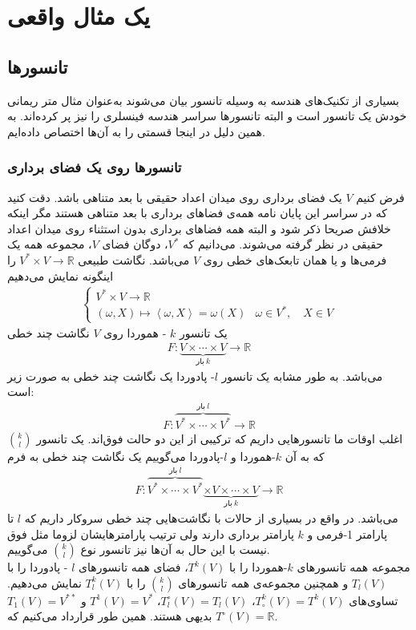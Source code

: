 \chapter{یک مثال واقعی }

\section{تانسورها}
بسیاری از تکنیک‌های هندسه به وسیله تانسور بیان می‌شوند به‌عنوان مثال متر ریمانی خودش یک تانسور است و البته تانسورها سراسر هندسه فینسلری را نیز پر کرده‌اند. به همین دلیل در اینجا قسمتی را به آن‌ها  اختصاص داده‌ایم.
\subsection{تانسورها روی یک فضای برداری}
فرض کنیم $V$ یک فضای برداری روی میدان اعداد حقیقی با بعد متناهی باشد. دقت کنید که در سراسر این پایان نامه همه‌ی فضاهای برداری با بعد متناهی هستند مگر اینکه خلافش صریحا ذکر شود و البته همه فضاهای برداری بدون استثناء روی میدان اعداد حقیقی در نظر گرفته می‌شوند. می‌دانیم که  $ V^* $، دوگان فضای $ V $، مجموعه همه یک فرمی‌ها و یا همان تابعک‌های خطی روی $V$  می‌باشد. نگاشت طبیعی 
$ V^* \times V \longrightarrow \mathbb{R} $ را اینگونه نمایش می‌دهیم
\begin{align*}
\left\lbrace
\begin{array}{lr}
V^* \times V \longrightarrow \mathbb{R} & \quad\\
\left( \omega,X\right)  \longmapsto \left \langle \omega,X \right \rangle = \omega(X) & \omega \in V^*,  \quad X \in V
\end{array}
 \right. 
\end{align*}
یک تانسور $ k $ - هموردا روی $ V $ نگاشت چند خطی 
\begin{align*}
F: \underbrace{V\times\cdots\times V}_{\text{بار}\ k} \longrightarrow \mathbb{R}
\end{align*}
 می‌باشد. به طور مشابه یک تانسور $ l $- پادوردا یک نگاشت چند خطی به صورت زیر است: 
\begin{align*}
F:\overbrace{V^*\times\cdots\times V^*}^{\text{بار}\ l}\longrightarrow \mathbb{R}
\end{align*}
اغلب اوقات ما تانسورهایی داریم که ترکیبی از این دو حالت فوق‌اند. یک تانسور $\binom{k}{l} $ که به آن $k$-هموردا و $l$-پادوردا می‌گوییم یک نگاشت چند خطی به فرم 
\begin{align*}
F:\overbrace{V^*\times\cdots\times V^*}^{\text{بار}\ l}%
\underbrace{\times V\times\cdots\times V}_{\text{بار}\ k}\longrightarrow \mathbb{R}
\end{align*}
می‌باشد. در واقع در بسیاری از حالات با نگاشت‌هایی چند خطی سروکار داریم که $l$ تا پارامتر 1-فرمی و $k$ پارامتر برداری دارند ولی ترتیب پارامترهایشان لزوما مثل فوق نیست با این حال به آن‌ها نیز تانسور نوع $\binom{k}{l}$ می‌گوییم.\\
مجموعه همه تانسورهای $k$-هموردا را با $T^k(V)$، فضای همه تانسورهای $ l $ - پادوردا را با $T_l(V)$ و همچنین مجموعه‌ی همه تانسورهای $ \binom{k}{l} $ را  با  $ T^k_l(V) $ نمایش می‌دهیم. تساوی‌های $T^k_\circ(V) = T^k(V)$، $T^\circ_l(V) = T_l(V)$، $T^1(V)=V^*$ و $T_1(V) = V^{**}$ بدیهی هستند. همین طور
 \mbox{قرار‌داد} 
  می‌کنیم که $T^\circ(V) = \mathbb{R}$. 

